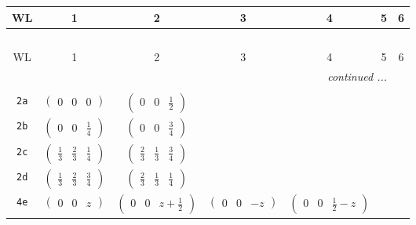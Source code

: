 \documentclass[fleqn,9pt,landscape]{jsarticle}
\begin{document}
\begin{center}
\renewcommand{\arraystretch}{1.2}
\begin{longtable}{ccccccc}
 \hline \hline
WL & 1 & 2 & 3 & 4 & 5 & 6 \\ \hline \endfirsthead

\multicolumn{6}{l}{\tablename\ \thetable{}} \\
 \hline \hline
WL & 1 & 2 & 3 & 4 & 5 & 6 \\ \hline \endhead

 \hline \hline
\multicolumn{6}{r}{\footnotesize\it continued ...} \\ \endfoot

 \hline \hline
\multicolumn{6}{r}{} \\ \endlastfoot

{\tt 2a} & $ \begin{pmatrix} 0 & 0 & 0 \end{pmatrix} $ & $ \begin{pmatrix} 0 & 0 & \frac{1}{2} \end{pmatrix} $ & $  $ & $  $ & $  $ & $  $ \\ \hline
{\tt 2b} & $ \begin{pmatrix} 0 & 0 & \frac{1}{4} \end{pmatrix} $ & $ \begin{pmatrix} 0 & 0 & \frac{3}{4} \end{pmatrix} $ & $  $ & $  $ & $  $ & $  $ \\ \hline
{\tt 2c} & $ \begin{pmatrix} \frac{1}{3} & \frac{2}{3} & \frac{1}{4} \end{pmatrix} $ & $ \begin{pmatrix} \frac{2}{3} & \frac{1}{3} & \frac{3}{4} \end{pmatrix} $ & $  $ & $  $ & $  $ & $  $ \\ \hline
{\tt 2d} & $ \begin{pmatrix} \frac{1}{3} & \frac{2}{3} & \frac{3}{4} \end{pmatrix} $ & $ \begin{pmatrix} \frac{2}{3} & \frac{1}{3} & \frac{1}{4} \end{pmatrix} $ & $  $ & $  $ & $  $ & $  $ \\ \hline
{\tt 4e} & $ \begin{pmatrix} 0 & 0 & z \end{pmatrix} $ & $ \begin{pmatrix} 0 & 0 & z + \frac{1}{2} \end{pmatrix} $ & $ \begin{pmatrix} 0 & 0 & - z \end{pmatrix} $ & $ \begin{pmatrix} 0 & 0 & \frac{1}{2} - z \end{pmatrix} $ & $  $ & $  $ \\ \hline

\end{longtable}
\end{center}
\end{document}
